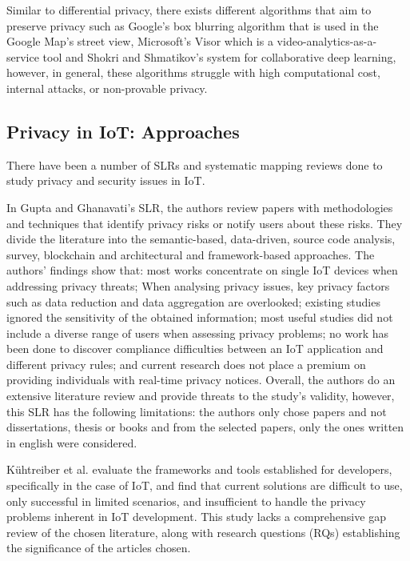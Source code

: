 Similar to differential privacy, there exists different algorithms that aim to
preserve privacy such as Google's box blurring algorithm \cite{FromeLarge}
that is used in the Google Map's street view, Microsoft's Visor \cite{poddar2020visor}
which is a video-analytics-as-a-service tool and Shokri and Shmatikov's
\cite{ShokriPrivacy} system for collaborative deep learning, however, in
general, these algorithms struggle with high computational cost, internal
attacks, or non-provable privacy.

\subsection{Privacy in IoT: Approaches}

There have been a number of SLRs \cite{Gupta2022Privacy, Kuhtreiber2022survey, sicari2015security, LinSurvey, yang2022overview, zubaydi2023leveraging}
and systematic mapping reviews \cite{porras2018security, ahmed2019aspects}
done to study privacy and security issues in IoT.

In Gupta and Ghanavati's \cite{Gupta2022Privacy} SLR, the authors review
papers with methodologies and techniques that identify privacy risks or
notify users about these risks. They divide the literature into the semantic-based,
data-driven, source code analysis, survey, blockchain and architectural
and framework-based approaches. The authors' findings show that: most works concentrate
on single IoT devices when addressing privacy threats; When analysing privacy
issues, key privacy factors such as data reduction and data aggregation
are overlooked; existing studies ignored the sensitivity of the obtained
information; most useful studies did not include a diverse range of users
when assessing privacy problems; no work has been done to discover compliance
difficulties between an IoT application and different privacy rules; and
current research does not place a premium on providing individuals with real-time
privacy notices. Overall, the authors do an extensive literature review
and provide threats to the study's validity, however, this SLR has the
following limitations: the authors only chose papers and not dissertations,
thesis or books and from the selected papers, only the ones written in english
were considered.

Kühtreiber et al. \cite{Kuhtreiber2022survey} evaluate the frameworks and
tools established for developers, specifically in the case of IoT, and find
that current solutions are difficult to use, only successful in limited
scenarios, and insufficient to handle the privacy problems inherent in IoT
development. This study lacks a comprehensive gap review of the chosen
literature, along with research questions (RQs) establishing the significance
of the articles chosen.

